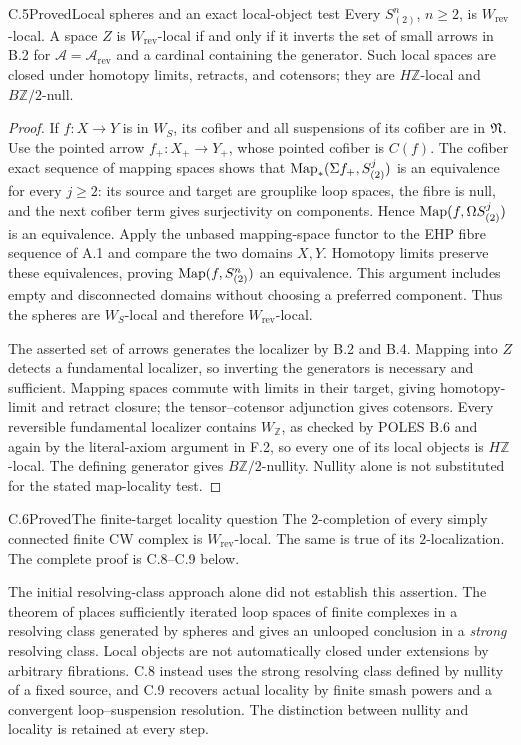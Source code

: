\begin{claim}{C.5}{Proved}{Local spheres and an exact local-object test}
Every $S^n_{(2)}$, $n\geq2$, is $W_{\mathrm{rev}}$-local. A space $Z$ is $W_{\mathrm{rev}}$-local if and only if it inverts the set of small arrows in B.2 for $\mathcal A=\mathcal A_{\mathrm{rev}}$ and a cardinal containing the generator. Such local spaces are closed under homotopy limits, retracts, and cotensors; they are $H\mathbb Z$-local and $B\mathbb Z/2$-null.
\end{claim}
\begin{proof}
If $f:X\to Y$ is in $W_S$, its cofiber and all suspensions of its cofiber are in $\mathfrak N$. Use the pointed arrow $f_+:X_+\to Y_+$, whose pointed cofiber is $C(f)$. The cofiber exact sequence of mapping spaces shows that $\operatorname{Map}_*(\Sigma f_+,S^j_{(2)})$ is an equivalence for every $j\geq2$: its source and target are grouplike loop spaces, the fibre is null, and the next cofiber term gives surjectivity on components. Hence $\operatorname{Map}(f,\Omega S^j_{(2)})$ is an equivalence. Apply the unbased mapping-space functor to the EHP fibre sequence of A.1 and compare the two domains $X,Y$. Homotopy limits preserve these equivalences, proving $\operatorname{Map}(f,S^n_{(2)})$ an equivalence. This argument includes empty and disconnected domains without choosing a preferred component. Thus the spheres are $W_S$-local and therefore $W_{\mathrm{rev}}$-local.

The asserted set of arrows generates the localizer by B.2 and B.4. Mapping into $Z$ detects a fundamental localizer, so inverting the generators is necessary and sufficient. Mapping spaces commute with limits in their target, giving homotopy-limit and retract closure; the tensor--cotensor adjunction gives cotensors. Every reversible fundamental localizer contains $W_{\mathbb Z}$, as checked by POLES B.6 and again by the literal-axiom argument in F.2, so every one of its local objects is $H\mathbb Z$-local. The defining generator gives $B\mathbb Z/2$-nullity. Nullity alone is not substituted for the stated map-locality test.
\end{proof}

\begin{claim}{C.6}{Proved}{The finite-target locality question}
The $2$-completion of every simply connected finite CW complex is $W_{\mathrm{rev}}$-local. The same is true of its $2$-localization. The complete proof is C.8--C.9 below.
\end{claim}
The initial resolving-class approach alone did not establish this assertion. The theorem of \citet[Theorem 8 and Corollaries 9 and 11]{Strom2003} places sufficiently iterated loop spaces of finite complexes in a resolving class generated by spheres and gives an unlooped conclusion in a \emph{strong} resolving class. Local objects are not automatically closed under extensions by arbitrary fibrations. C.8 instead uses the strong resolving class defined by nullity of a fixed source, and C.9 recovers actual locality by finite smash powers and a convergent loop--suspension resolution. The distinction between nullity and locality is retained at every step.

